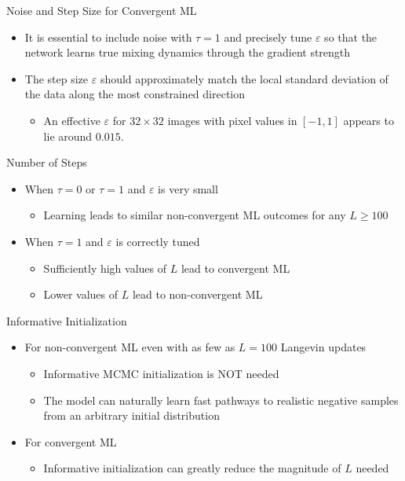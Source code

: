 \documentclass{beamer}
\begin{document}
\begin{frame}{Noise and Step Size for Convergent ML}
\begin{itemize}
\item It is essential to include noise with
$\tau=1$ and precisely tune $\varepsilon$ so that the network learns
true mixing dynamics through the gradient strength
\item The
step size $\varepsilon$ should approximately match the local standard
deviation of the data along the most constrained direction
\begin{itemize}
\item An effective $\varepsilon$ for $32\times32$ images with pixel values in $[-1,1]$ appears to lie around $0.015$.
\end{itemize}
\end{itemize}
\end{frame}

\begin{frame}{Number of Steps}
\begin{itemize}
\item When $\tau=0$ or $\tau=1$ and $\varepsilon$ is very small
\begin{itemize}
\item Learning leads to similar non-convergent ML outcomes for any $L\geq100$
\end{itemize}
\item When $\tau=1$ and $\varepsilon$ is correctly tuned
\begin{itemize}
\item Sufficiently high values of $L$ lead to convergent ML
\item Lower values of $L$ lead to non-convergent ML
\end{itemize}
\end{itemize}
\end{frame}

\begin{frame}{Informative Initialization}
\begin{itemize}
\item For non-convergent ML even with as few as $L=100$ Langevin updates
\begin{itemize}
\item Informative MCMC initialization is NOT needed
\item The model can naturally learn fast pathways to realistic negative samples from an arbitrary initial distribution
\end{itemize}
\item For convergent ML
\begin{itemize}
\item Informative initialization can greatly reduce the magnitude of $L$ needed
\end{itemize}
\end{itemize}
\end{frame}
\end{document}
